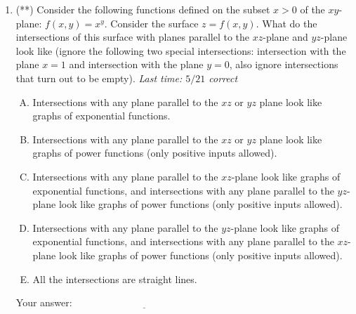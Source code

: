 \documentclass[10pt]{amsart}
\begin{document}
\begin{enumerate}
\item (**) Consider the following functions defined on the subset $x >
  0$ of the $xy$-plane: $f(x,y) = x^y$. Consider the surface $z =
  f(x,y)$. What do the intersections of this surface with planes
  parallel to the $xz$-plane and $yz$-plane look like (ignore the
  following two special intersections: intersection with the plane $x
  = 1$ and intersection with the plane $y = 0$, also ignore
  intersections that turn out to be empty). {\em Last time: $5/21$
  correct}

  \begin{enumerate}[(A)]
  \item Intersections with any plane parallel to the $xz$ or $yz$
    plane look like graphs of exponential functions.
  \item Intersections with any plane parallel to the $xz$ or $yz$
    plane look like graphs of power functions (only positive inputs allowed).
  \item Intersections with any plane parallel to the $xz$-plane look
    like graphs of exponential functions, and intersections with any
    plane parallel to the $yz$-plane look like graphs of power
    functions (only positive inputs allowed).
  \item Intersections with any plane parallel to the $yz$-plane look
    like graphs of exponential functions, and intersections with any
    plane parallel to the $xz$-plane look like graphs of power
    functions (only positive inputs allowed).
  \item All the intersections are straight lines.
  \end{enumerate}

  \vspace{0.05in}
  Your answer: $\underline{\qquad\qquad\qquad\qquad\qquad\qquad\qquad}$
  \vspace{0.5in}
\end{enumerate}
\end{document}
